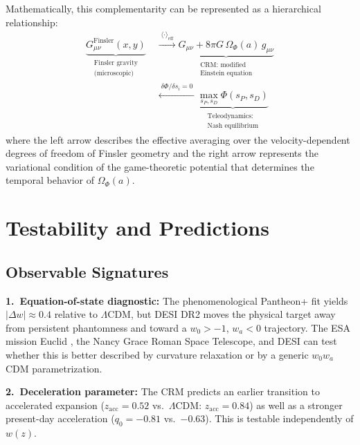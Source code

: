 \documentclass[aps,prd,twocolumn,superscriptaddress,nofootinbib]{revtex4-2}
\begin{document}
Mathematically, this complementarity can be represented as a hierarchical relationship:
\begin{equation}
\begin{split}
\underbrace{G_{\mu\nu}^{\mathrm{Finsler}}(x, y)}_{\substack{\text{Finsler gravity}\\\text{(microscopic)}}}
&\;\xrightarrow{\;\langle\cdot\rangle_{\mathrm{eff}}\;}
\underbrace{G_{\mu\nu} + 8\pi G\,\Omega_\Phi(a)\,g_{\mu\nu}}_{\substack{\text{CRM: modified}\\\text{Einstein equation}}} \\
&\;\xleftarrow{\;\delta\Phi/\delta s_i = 0\;}
\underbrace{\max_{s_P, s_D} \Phi(s_P, s_D)}_{\substack{\text{Teleodynamics:}\\\text{Nash equilibrium}}}
\end{split}
\label{eq:complementarity}
\end{equation}
where the left arrow describes the effective averaging over the velocity-dependent degrees of freedom of Finsler geometry and the right arrow represents the variational condition of the game-theoretic potential that determines the temporal behavior of $\Omega_\Phi(a)$.


\section{Testability and Predictions}
\label{sec:testability}

\subsection{Observable Signatures}

\textbf{1.~Equation-of-state diagnostic:} The phenomenological Pantheon+ fit yields $|\Delta w| \approx 0.4$ relative to $\Lambda$CDM, but DESI DR2 moves the physical target away from persistent phantomness and toward a $w_0>-1$, $w_a<0$ trajectory. The ESA mission Euclid \cite{Euclid2024}, the Nancy Grace Roman Space Telescope, and DESI can test whether this is better described by curvature relaxation or by a generic $w_0w_a$CDM parametrization.

\textbf{2.~Deceleration parameter:} The CRM predicts an earlier transition to accelerated expansion ($z_{\mathrm{acc}} = 0.52$ vs.\ $\Lambda$CDM: $z_{\mathrm{acc}} = 0.84$) as well as a stronger present-day acceleration ($q_0 = -0.81$ vs.\ $-0.63$). This is testable independently of $w(z)$.
\end{document}
